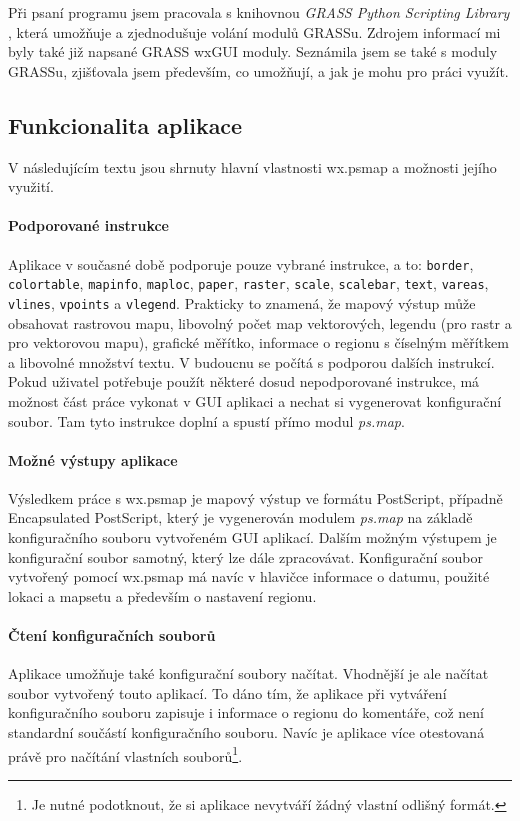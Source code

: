 \documentclass[a4paper,12pt,draft]{article}
\newcommand{\modul}[1]{\emph{#1}}
\newcommand{\instr}[1]{\lstinline[style=psmapInline]|#1|}
\begin{document}
Při psaní programu jsem pracovala s knihovnou \emph{GRASS Python
Scripting Library} \cite{script}, která umožňuje a zjednodušuje
volání modulů GRASSu. Zdrojem informací mi byly také již napsané
GRASS wxGUI moduly. Seznámila jsem se také s moduly GRASSu, zjišťovala
jsem především, co umožňují, a jak je mohu pro práci využít.

\subsection{Funkcionalita aplikace}
V následujícím textu jsou shrnuty hlavní vlastnosti wx.psmap a možnosti
jejího využití.

\paragraph*{Podporované instrukce}
    Aplikace v současné době podporuje pouze vybrané instrukce, a to:
    \instr{border}, \instr{colortable}, \instr{mapinfo}, \instr{maploc},
    \instr{paper}, \instr{raster}, \instr{scale}, \instr{scalebar},
    \instr{text}, \instr{vareas}, \instr{vlines}, \instr{vpoints} a
    \instr{vlegend}. Prakticky to znamená, že mapový výstup může
    obsahovat rastrovou mapu, libovolný počet map vektorových, legendu (pro
    rastr a pro vektorovou mapu), grafické měřítko, informace o regionu
    s číselným měřítkem a libovolné množství textu. V budoucnu se
    počítá s podporou dalších instrukcí. Pokud uživatel potřebuje
    použít některé dosud nepodporované instrukce, má možnost část
    práce vykonat v GUI aplikaci a nechat si vygenerovat konfigurační
    soubor. Tam tyto instrukce doplní a spustí přímo modul \modul{ps.map}.

\paragraph*{Možné výstupy aplikace}
Výsledkem práce s wx.psmap je mapový výstup ve formátu PostScript,
případně Encapsulated PostScript, který je vygenerován modulem
\modul{ps.map} na základě konfiguračního souboru vytvořeném GUI
aplikací. Dalším možným výstupem je konfigurační soubor samotný,
který lze dále zpracovávat. Konfigurační soubor vytvořený pomocí
wx.psmap má navíc v hlavičce informace o datumu, použité lokaci a
mapsetu a především o nastavení regionu.

\paragraph*{Čtení konfiguračních souborů}
Aplikace umožňuje také konfigurační soubory načítat. Vhodnější
je ale načítat soubor vytvořený touto aplikací. To dáno tím, že
aplikace při vytváření konfiguračního souboru zapisuje i informace o
regionu do komentáře, což není standardní součástí konfiguračního
souboru. Navíc je aplikace více otestovaná právě pro načítání
vlastních souborů\footnote{Je nutné podotknout, že si aplikace nevytváří
žádný vlastní odlišný formát.}.
\end{document}
